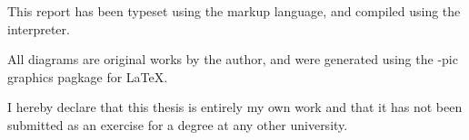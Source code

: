 
This report has been typeset using the \Latex{} markup language, 
and compiled using the \LaTeXe{} interpreter. 


All diagrams are original works by the author, and were generated 
using the \Xy-pic{} graphics pagkage for \LaTeX{}.


\vfill


I hereby declare that this thesis is entirely my own work and that it
has not been submitted as an exercise for a degree at any other
university.

\vspace{35mm}

\begin{flushright}

\underline{\hspace*{7.5cm} 

Conall O'Brien

\today

\end{flushright}
